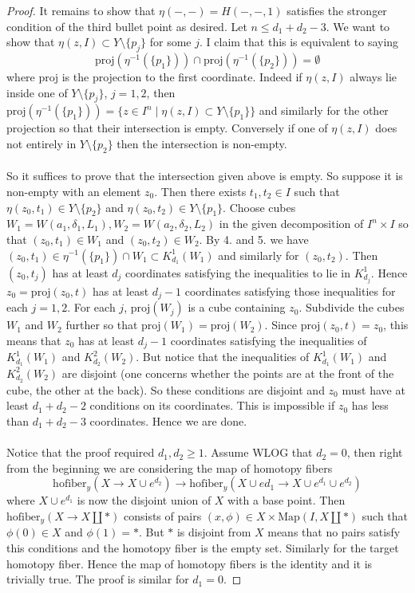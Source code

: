 \documentclass[a4paper]{article}
\begin{document}
\begin{prp}{}{}
\begin{proof}
It remains to show that $\eta(-,-)=H(-,-,1)$ satisfies the stronger condition of the third bullet point as desired. Let $n\leq d_1+d_2-3$. We want to show that $\eta(z,I)\subset Y\setminus\{p_j\}$ for some $j$. I claim that this is equivalent to saying $$\text{proj}\left(\eta^{-1}(\{p_1\})\right)\cap\text{proj}\left(\eta^{-1}(\{p_2\})\right)=\emptyset$$ where $\text{proj}$ is the projection to the first coordinate. Indeed if $\eta(z,I)$ always lie inside one of $Y\setminus\{p_j\}$, $j=1,2$, then $\text{proj}\left(\eta^{-1}(\{p_1\})\right)=\{z\in I^n\;|\;\eta(z,I)\subset Y\setminus\{p_1\}\}$ and similarly for the other projection so that their intersection is empty. Conversely if one of $\eta(z,I)$ does not entirely in $Y\setminus\{p_2\}$ then the intersection is non-empty. \\~\\

So it suffices to prove that the intersection given above is empty. So suppose it is non-empty with an element $z_0$. Then there exists $t_1,t_2\in I$ such that $\eta(z_0,t_1)\in Y\setminus\{p_2\}$ and $\eta(z_0,t_2)\in Y\setminus\{p_1\}$. Choose cubes $W_1=W(a_1,\delta_1,L_1),W_2=W(a_2,\delta_2,L_2)$ in the given decomposition of $I^n\times I$ so that $(z_0,t_1)\in W_1$ and $(z_0,t_2)\in W_2$. By 4. and 5. we have $(z_0,t_1)\in\eta^{-1}(\{p_1\})\cap W_1\subset  K_{d_1}^1(W_1)$ and similarly for $(z_0,t_2)$. Then $(z_0,t_j)$ has at least $d_j$ coordinates satisfying the inequalities to lie in $K_{d_j}^1$. Hence $z_0=\text{proj}(z_0,t)$ has at least $d_j-1$ coordinates satisfying those inequalities for each $j=1,2$. For each $j$, $\text{proj}(W_j)$ is a cube containing $z_0$. Subdivide the cubes $W_1$ and $W_2$ further so that $\text{proj}(W_1)=\text{proj}(W_2)$. Since $\text{proj}(z_0,t)=z_0$, this means that $z_0$ has at least $d_j-1$ coordinates satisfying the inequalities of $K_{d_1}^1(W_1)$ and $K_{d_2}^2(W_2)$. But notice that the inequalities of $K_{d_1}^1(W_1)$ and $K_{d_2}^2(W_2)$ are disjoint (one concerns whether the points are at the front of the cube, the other at the back). So these conditions are disjoint and $z_0$ must have at least $d_1+d_2-2$ conditions on its coordinates. This is impossible if $z_0$ has less than $d_1+d_2-3$ coordinates. Hence we are done. \\~\\

Notice that the proof required $d_1,d_2\geq 1$. Assume WLOG that $d_2=0$, then right from the beginning we are considering the map of homotopy fibers $$\text{hofiber}_y(X\to X\cup e^{d_2})\to\text{hofiber}_y(X\cup e{d_1}\to X\cup e^{d_1}\cup e^{d_2})$$ where $X\cup e^{d_1}$ is now the disjoint union of $X$ with a base point. Then $\text{hofiber}_y(X\to X\amalg\ast)$ consists of pairs $(x,\phi)\in X\times\text{Map}(I,X\amalg\ast)$ such that $\phi(0)\in X$ and $\phi(1)=\ast$. But $\ast$ is disjoint from $X$ means that no pairs satisfy this conditions and the homotopy fiber is the empty set. Similarly for the target homotopy fiber. Hence the map of homotopy fibers is the identity and it is trivially true. The proof is similar for $d_1=0$. 
\end{proof}
\end{prp}
\end{document}
